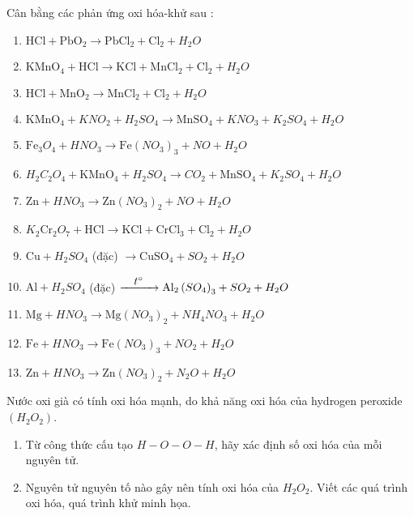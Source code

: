 \begin{bt}
	Cân bằng các phản ứng oxi hóa-khử sau :
	\begin{enumerate}[(1)]
		\item $\mathrm{HCl}+\mathrm{PbO}_2\longrightarrow \mathrm{PbCl}_2+\mathrm{Cl}_2+H_2O$
		\item $\mathrm{KMnO}_4+\mathrm{HCl} \longrightarrow \mathrm{KCl}+\mathrm{MnCl}_2+\mathrm{Cl}_2+H_2O$
		\item $\mathrm{HCl}+\mathrm{MnO}_2\longrightarrow \mathrm{MnCl}_2+\mathrm{Cl}_2+H_2O$
		\item $\mathrm{KMnO}_4+KNO_2+H_2SO_4\longrightarrow \mathrm{MnSO}_4+KNO_3+K_2SO_4+H_2O$
		\item $\mathrm{Fe}_3O_4+HNO_3\longrightarrow \mathrm{Fe}\left(NO_3\right)_3+NO+H_2O$
		\item $H_2C_2O_4+\mathrm{KMnO}_4+H_2SO_4\longrightarrow CO_2+\mathrm{MnSO}_4+K_2SO_4+H_2O$
		\item $\mathrm{Zn}+HNO_3\longrightarrow \mathrm{Zn}\left(NO_3\right)_2+NO+H_2O$
		\item $K_2\mathrm{Cr}_2O_7+\mathrm{HCl} \longrightarrow \mathrm{KCl}+\mathrm{CrCl}_3+\mathrm{Cl}_2+H_2O$
		\item $\mathrm{Cu}+H_2SO_4$ (đặc) $\longrightarrow \mathrm{CuSO}_4+SO_2+H_2O$
		\item $\mathrm{Al}+H_2SO_4$ (đặc) $\xrightarrow{\makebox[1cm]{$t^{\circ}$}} \mathrm{Al}_2\left(SO_4\right)_3+SO_2+H_2O$
		\item $\mathrm{Mg}+HNO_3\longrightarrow \mathrm{Mg}\left(NO_3\right)_2+NH_4NO_3+H_2O$
		\item $\mathrm{Fe}+HNO_3\longrightarrow \mathrm{Fe}\left(NO_3\right)_3+NO_2+H_2O$
		\item $\mathrm{Zn}+HNO_3\longrightarrow \mathrm{Zn}\left(NO_3\right)_2+N_2O+H_2O$
	\end{enumerate}
\end{bt}
\begin{bt}
	Nước oxi già có tính oxi hóa mạnh, do khả năng oxi hóa của hydrogen peroxide $\left(H_2O_2\right)$.
	\begin{enumerate}
		\item Từ công thức cấu tạo $H-O-O-H$, hãy xác định số oxi hóa của mỗi nguyên tử.
		\item Nguyên tử nguyên tố nào gây nên tính oxi hóa của $H_2O_2$. Viết các quá trình oxi hóa, quá trình khử minh họa.
	\end{enumerate}
	\loigiai{}
\end{bt}
